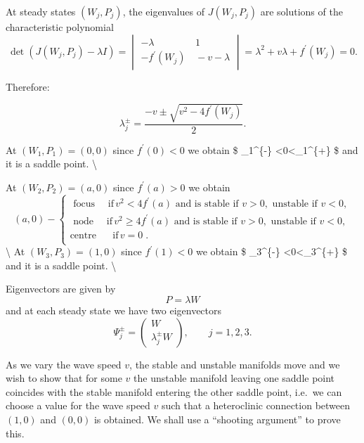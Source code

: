 \documentclass[
  letterpaper,
  DIV=11,
  numbers=noendperiod]{scrreprt}
\theoremstyle{plain}
\theoremstyle{definition}
\theoremstyle{plain}
\theoremstyle{remark}
\begin{document}
At steady states \((W_j, P_j)\), the eigenvalues of \(J(W_j,P_j)\) are
solutions of the characteristic polynomial \[
\det(J(W_j,P_j) - \lambda I) = \begin{vmatrix} -\lambda & \, 1\\
- f^\prime(W_j) & \, -v - \lambda
\end{vmatrix} = \lambda^2 + v \lambda + f^\prime(W_j) = 0 .
\]

Therefore:

\[
 \lambda^{\pm}_j = \frac{ - v \pm \sqrt{ v^2 - 4 f^\prime(W_j)}}2.
\]

At \((W_1, P_1)=(0,0)\) since \(f^\prime(0) <0\) we obtain \$
\lambda\_1\^{}\{-\} \textless0\textless{}\lambda\_1\^{}\{+\} \$ and it
is a saddle point. \textbackslash{}

At \((W_2, P_2)=(a,0)\) since \(f^\prime(a) >0\) we obtain \[
 (a,0) - \begin{cases}
 \text{ focus} \quad \text{ if} \, v^2 < 4 f^\prime(a) \text{ and is stable if } v>0,   \text{ unstable if } v<0, \\
  \text{ node} \quad \text{ if} \, v^2 \geq 4 f^\prime(a) \text{ and is stable if } v>0,   \text{ unstable if } v<0, \\
   \text{centre } \quad \text{ if} \, v=0 \; . \\
 \end{cases}
 \] \textbackslash{} At \((W_3, P_3)=(1,0)\) since \(f^\prime(1) <0\) we
obtain \$ \lambda\_3\^{}\{-\} \textless0\textless{}\lambda\_3\^{}\{+\}
\$ and it is a saddle point. \textbackslash{}

Eigenvectors are given by \[
 P =\lambda W
\] and at each steady state we have two eigenvectors \[
 \Psi_j^{\pm} = \begin{pmatrix}
 W\\
 \lambda_j^\pm W
 \end{pmatrix} , \qquad  j=1,2, 3.
\]

As we vary the wave speed \(v\), the stable and unstable manifolds move
and we wish to show that for some \(v\) the unstable manifold leaving
one saddle point coincides with the stable manifold entering the other
saddle point, i.e.~we can choose a value for the wave speed \(v\) such
that a heteroclinic connection between \((1,0)\) and \((0,0)\) is
obtained. We shall use a ``shooting argument'' to prove this.
\end{document}

